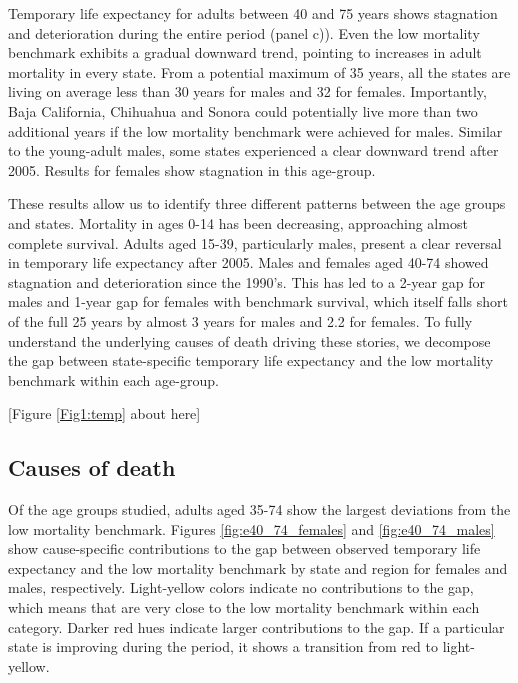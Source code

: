 \documentclass[11.5pt]{article}
\begin{document}
\begin{spacing}{1.5}
Temporary life expectancy for adults between 40 and 75 years shows stagnation and deterioration during the entire period (panel c)). Even the low mortality benchmark exhibits a gradual downward trend, pointing to increases in adult mortality in every state. From a potential maximum of 35 years, 
all the states are living on average less than 30 years for males and 32 for females. Importantly,  Baja California, Chihuahua and Sonora could potentially live more than two additional years if the low mortality benchmark were achieved for males. Similar to the young-adult males, some states experienced a  clear downward trend after 2005. Results for females show stagnation in this age-group. 

These results allow us to identify three different patterns between the age groups and states. Mortality in ages 0-14 has been decreasing, approaching almost complete survival. Adults aged 15-39, particularly males, present a clear reversal in temporary life expectancy after 2005. Males and females aged 40-74 showed stagnation and deterioration since the 1990's. This has led to a 2-year gap for males and 1-year gap for females with benchmark survival, which itself falls short of the full 25 years by almost 3 years for males and 2.2 for females. To fully understand the underlying causes of death driving these stories, we decompose the gap between state-specific temporary life expectancy and the low mortality benchmark within each age-group.\\

\begin{center}
[Figure \ref{Fig1:temp} about here]
\end{center}




\subsection*{Causes of death}

Of the age groups studied, adults aged 35-74 show the largest deviations from the low mortality benchmark. Figures  \ref{fig:e40_74_females} and \ref{fig:e40_74_males} show cause-specific contributions to the gap between observed temporary life expectancy and the low mortality benchmark by state and region for females and males, respectively. Light-yellow colors indicate no contributions to the gap, which means that are very close to the low mortality benchmark within each category. Darker red hues indicate larger contributions to the gap. If a particular state is improving during the period, it shows a transition from red to light-yellow. 


\end{spacing}
\end{document}
